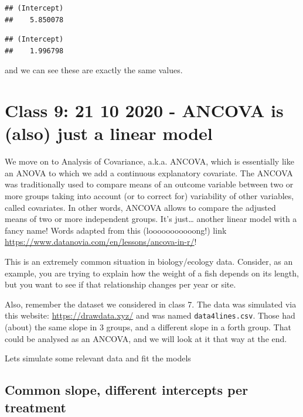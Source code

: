 \documentclass[
]{book}
\newenvironment{Shaded}{\begin{snugshade}}{\end{snugshade}}
\newcommand{\DecValTok}[1]{\textcolor[rgb]{0.00,0.00,0.81}{#1}}
\newcommand{\NormalTok}[1]{#1}
\newcommand{\OperatorTok}[1]{\textcolor[rgb]{0.81,0.36,0.00}{\textbf{#1}}}
\begin{document}
\begin{verbatim}
## (Intercept) 
##    5.850078
\end{verbatim}

\begin{Shaded}
\end{Shaded}

\begin{verbatim}
## (Intercept) 
##    1.996798
\end{verbatim}

and we can see these are exactly the same values.

\hypertarget{aula9}{%
\chapter{Class 9: 21 10 2020 - ANCOVA is (also) just a linear model}\label{aula9}}

We move on to Analysis of Covariance, a.k.a. ANCOVA, which is essentially like an ANOVA to which we add a continuous explanatory covariate. The ANCOVA was traditionally used to compare means of an outcome variable between two or more groups taking into account (or to correct for) variability of other variables, called covariates. In other words, ANCOVA allows to compare the adjusted means of two or more independent groups. It's just\ldots{} another linear model with a fancy name! Words adapted from this (looooooooooong!) link \url{https://www.datanovia.com/en/lessons/ancova-in-r/}!

This is an extremely common situation in biology/ecology data. Consider, as an example, you are trying to explain how the weight of a fish depends on its length, but you want to see if that relationship changes per year or site.

Also, remember the dataset we considered in class 7. The data was simulated via this website: \url{https://drawdata.xyz/} and was named \texttt{data4lines.csv}. Those had (about) the same slope in 3 groups, and a different slope in a forth group. That could be analysed as an ANCOVA, and we will look at it that way at the end.

Lets simulate some relevant data and fit the models

\hypertarget{common-slope-different-intercepts-per-treatment}{%
\section{Common slope, different intercepts per treatment}\label{common-slope-different-intercepts-per-treatment}}
\end{document}
